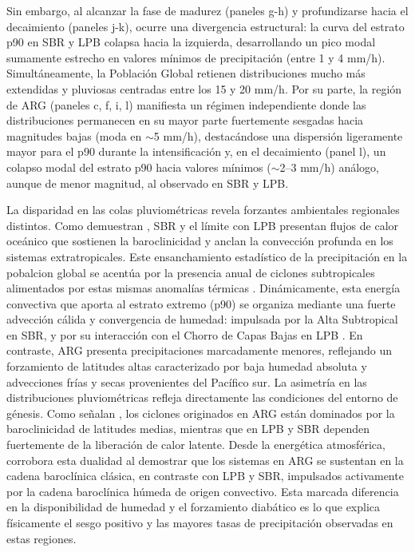 Sin embargo, al alcanzar la fase de madurez (paneles g-h) y profundizarse hacia el decaimiento (paneles j-k), ocurre una divergencia estructural: la curva del estrato p90 en SBR y LPB colapsa hacia la izquierda, desarrollando un pico modal sumamente estrecho en valores mínimos de precipitación (entre 1 y 4 mm/h). Simultáneamente, la Población Global retienen distribuciones mucho más extendidas y pluviosas centradas entre los 15 y 20 mm/h. Por su parte, la región de ARG (paneles c, f, i, l) manifiesta un régimen independiente donde las distribuciones permanecen en su mayor parte fuertemente sesgadas hacia magnitudes bajas (moda en $\sim$5 mm/h), destacándose una dispersión ligeramente mayor para el p90 durante la intensificación y, en el decaimiento (panel l), un colapso modal del estrato p90 hacia valores mínimos ($\sim$2--3 mm/h) análogo, aunque de menor magnitud, al observado en SBR y LPB.

La disparidad en las colas pluviométricas revela forzantes ambientales regionales distintos. Como demuestran \citet{russo2025impacts}, SBR y el límite con LPB presentan flujos de calor oceánico que sostienen la baroclinicidad y anclan la convección profunda en los sistemas extratropicales. Este ensanchamiento estadístico de la precipitación en la pobalcion global se acentúa por la presencia anual de ciclones subtropicales alimentados por estas mismas anomalías térmicas \citep{evans2012climatology}. Dinámicamente, esta energía convectiva que aporta al estrato extremo (p90) se organiza mediante una fuerte advección cálida y convergencia de humedad: impulsada por la Alta Subtropical en SBR, y por su interacción con el Chorro de Capas Bajas en LPB \citep{gramcianinov2024early}. En contraste, ARG presenta precipitaciones marcadamente menores, reflejando un forzamiento de latitudes altas caracterizado por baja humedad absoluta y advecciones frías y secas provenientes del Pacífico sur.
La asimetría en las distribuciones pluviométricas refleja directamente las condiciones del entorno de génesis. Como señalan \citet{gramcianinov2019properties}, los ciclones originados en ARG están dominados por la baroclinicidad de latitudes medias, mientras que en LPB y SBR dependen fuertemente de la liberación de calor latente. Desde la energética atmosférica, \citet{coutodesouza2024thesis} corrobora esta dualidad al demostrar que los sistemas en ARG se sustentan en la cadena baroclínica clásica, en contraste con LPB y SBR, impulsados activamente por la cadena baroclínica húmeda de origen convectivo. Esta marcada diferencia en la disponibilidad de humedad y el forzamiento diabático es lo que explica físicamente el sesgo positivo y las mayores tasas de precipitación observadas en estas regiones.
% 

